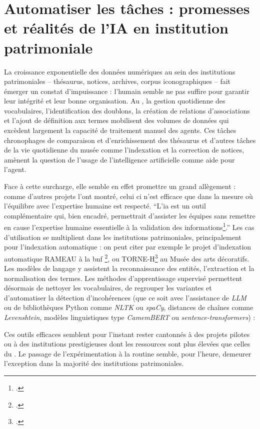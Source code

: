 \section{\label{III-C-1}Automatiser les tâches : promesses et réalités de l’IA en institution patrimoniale}

La croissance exponentielle des données numériques au sein des institutions patrimoniales -- thésaurus, notices, archives, corpus iconographiques -- fait émerger un constat d’impuissance : l’humain semble ne pas suffire pour garantir leur intégrité et leur bonne organisation. Au \mae, la gestion quotidienne des vocabulaires, l’identification des doublons, la création de relations d'associations et l'ajout de définition aux termes mobilisent des volumes de données qui excèdent largement la capacité de traitement manuel des agents. Ces tâches chronophages de comparaison et d'enrichissement des thésaurus et d'autres tâches de la vie quotidienne du musée comme l'indexation et la correction de notices, amènent la question de l'usage de l'intelligence artificielle comme aide pour l'agent.

Face à cette surcharge, elle semble en effet promettre un grand allègement : comme d'autres projets l'ont montré, celui ci n'est efficace que dans la mesure où l'équilibre avec l'expertise humaine est respecté. \enquote{L’\ac{ia} est \textelp{} un outil complémentaire qui, bien encadré, permettrait d’assister les équipes sans remettre en cause l’expertise humaine essentielle à la validation des informations\footcite{bermesRepenserCollectionsPatrimoniales2025}.} Les cas d’utilisation se multiplient dans les institutions patrimoniales, principalement pour l’indexation automatique : on peut citer par exemple le projet d'indexation automatique RAMEAU à la \ac{bnf} \footcite{filabesLindexationRAMEAUAssistee2025}, ou TORNE-H\footcite{bermesRepenserCollectionsPatrimoniales2025} au Musée des arts décoratifs. Les modèles de langage y assistent la reconnaissance des entités, l’extraction et la normalisation des termes. Les méthodes d’apprentissage supervisé permettent désormais de nettoyer les vocabulaires, de regrouper les variantes et d’automatiser la détection d’incohérences (que ce soit avec l'assistance de \textit{LLM} ou de bibliothèques Python comme \textit{NLTK} ou \textit{spaCy}, distances de chaînes comme \textit{Levenshtein}, modèles linguistiques type \textit{CamemBERT} ou \textit{sentence-transformers}) :


Ces outils efficaces semblent pour l'instant rester cantonnés à des projets pilotes ou à des institutions prestigieuses dont les ressources sont plus élevées que celles du \mae. Le passage de l’expérimentation à la routine semble, pour l’heure, demeurer l’exception dans la majorité des institutions patrimoniales.